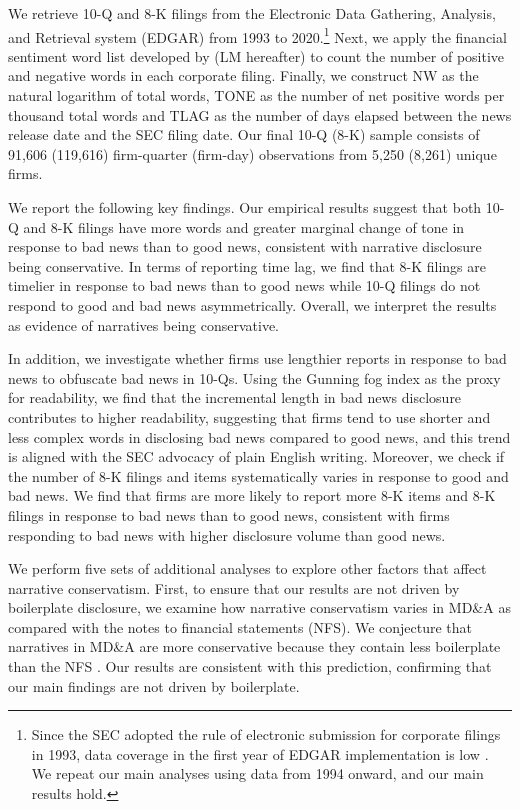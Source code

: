 \documentclass[letterpaper,12pt]{article}
\begin{document}
\begin{spacing}{1.5}
We retrieve 10-Q and 8-K filings from the Electronic Data Gathering, Analysis, and Retrieval system (EDGAR) from 1993 to 2020.\footnote{Since the SEC adopted the rule of electronic submission for corporate filings in 1993, data coverage in the first year of EDGAR implementation is low \cite{gaoInformingMarketEffect2020}. We repeat our main analyses using data from 1994 onward, and our main results hold.} Next, we apply the financial sentiment word list developed by  (LM hereafter) to count the number of positive and negative words in each corporate filing. Finally, we construct NW as the natural logarithm of total words, TONE as the number of net positive words per thousand total words and TLAG as the number of days elapsed between the news release date and the SEC filing date. Our final 10-Q (8-K) sample consists of 91,606 (119,616) firm-quarter (firm-day) observations from 5,250 (8,261) unique firms. 

We report the following key findings. Our empirical results suggest that both 10-Q and 8-K filings have more words and greater marginal change of tone in response to bad news than to good news, consistent with narrative disclosure being conservative. In terms of reporting time lag, we find that 8-K filings are timelier in response to bad news than to good news while 10-Q filings do not respond to good and bad news asymmetrically. Overall, we interpret the results as evidence of narratives being conservative.

In addition, we investigate whether firms use lengthier reports in response to bad news to obfuscate bad news in 10-Qs. Using the Gunning fog index as the proxy for readability, we find that the incremental length in bad news disclosure contributes to higher readability, suggesting that firms tend to use shorter and less complex words in disclosing bad news compared to good news, and this trend is aligned with the SEC advocacy of plain English writing. Moreover, we check if the number of 8-K filings and items systematically varies in response to good and bad news. We find that firms are more likely to report more 8-K items and 8-K filings in response to bad news than to good news, consistent with firms responding to bad news with higher disclosure volume than good news.

We perform five sets of additional analyses to explore other factors that affect narrative conservatism. First, to ensure that our results are not driven by boilerplate disclosure, we examine how narrative conservatism varies in MD\&A as compared with the notes to financial statements (NFS). We conjecture that narratives in MD\&A are more conservative because they contain less boilerplate than the NFS \cite{secFinancialReportingManual2019}. Our results are consistent with this prediction, confirming that our main findings are not driven by boilerplate. 


\end{spacing}
\end{document}
